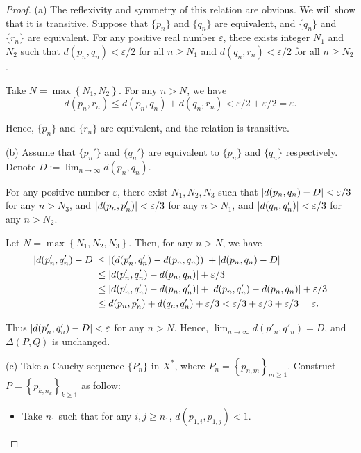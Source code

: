 \documentclass{article}
\begin{document}
\begin{proof}
	(a) The reflexivity and symmetry of this relation are obvious. We will show that it is transitive. Suppose that \( \{p_n\} \) and \( \{q_n\} \) are equivalent, and \( \{q_n\} \) and \( \{r_n\} \) are equivalent. For any positive real number \( \varepsilon \), there exists integer \( N_1 \) and \( N_2 \) such that \( d(p_n,q_n)<\varepsilon/2 \) for all \( n\geq N_1 \) and \( d(q_n,r_n)<\varepsilon/2 \) for all \( n\geq N_2 \).\par
	Take \( N=\max \left\{N_1,N_2\right\} \). For any \( n>N \), we have
	\[ d(p_n,r_n)\le d(p_n,q_n)+d(q_n,r_n)<\varepsilon/2+\varepsilon/2=\varepsilon. \] \par
	Hence, \( \{p_n\} \) and \( \{r_n\} \) are equivalent, and the relation is transitive.\par
	(b) Assume that \( \{p_n'\} \) and \( \{q_n'\} \) are equivalent to \( \{p_n\} \) and \( \{q_n\} \) respectively. Denote \( D:=\lim_{n\to\infty}d(p_n,q_n) \). \par
	For any positive number \( \varepsilon \), there exist \( N_1,N_2,N_3 \) such that \( \left|d(p_n,q_n)-D\right|<\varepsilon/3 \) for any \( n>N_3 \), and \( \left|d(p_n,p'_n)\right|<\varepsilon/3 \) for any \( n>N_1 \), and \( \left|d(q_n,q'_n)\right|<\varepsilon/3 \) for any \( n>N_2 \). \par
	Let \( N=\max \left\{N_1,N_2,N_3\right\} \). Then, for any \( n>N \), we have
	\begin{align*}
		\left|d(p'_n,q'_n)-D\right|
		&\le\left|\left(d(p'_n,q'_n)-d(p_n,q_n)\right)\right|+\left|d(p_n,q_n)-D\right|\\
		&\le \left|d(p'_n,q'_n)-d(p_n,q_n)\right|+\varepsilon/3\\
		&\le \left|d(p'_n,q'_n)-d(p_n,q'_n)\right|+\left|d(p_n,q'_n)-d(p_n,q_n)\right|+\varepsilon/3\\
		&\le d(p_n,p'_n)+d(q_n,q'_n)+\varepsilon/3
		<\varepsilon/3+\varepsilon/3+\varepsilon/3=\varepsilon.
	\end{align*}\par
	Thus \( \left|d(p'_n,q'_n)-D\right|<\varepsilon \) for any \( n>N \). Hence, \( \lim_{n\to\infty}d(p'_n,q'_n)=D \), and \( \Delta(P,Q) \) is unchanged.\par
	(c) Take a Cauchy sequence \( \{P_n\} \) in \( X^* \), where \( P_n=\left\{p_{n,m}\right\}_{m\ge 1} \). Construct \( P=\left\{p_{k,n_k}\right\}_{k\ge 1} \) as follow:
	\begin{itemize}
		\item Take \( n_1 \) such that for any \( i,j\ge n_1 \), \( d(p_{1,i},p_{1,j})<1 \).

\end{itemize}
\end{proof}
\end{document}
